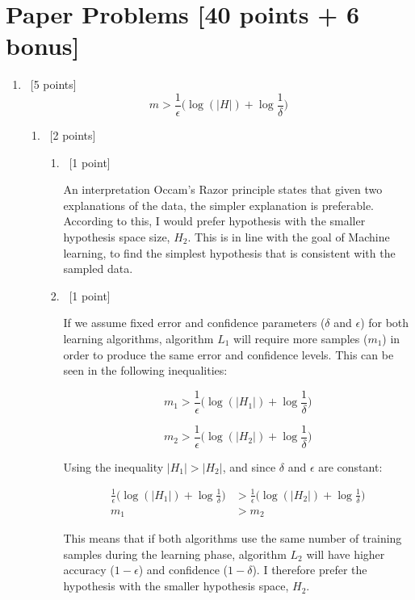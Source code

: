\documentclass[12pt, fullpage,letterpaper]{article}
\begin{document}
\section{Paper Problems [40 points + 6 bonus]}
\begin{enumerate}
\item~[5 points] 
\[
m > \frac{1}{\epsilon}\big(\log(|H|) + \log\frac{1}{\delta}\big)
\]

\begin{enumerate}
	\item~[2 points]
	\begin{enumerate}
		\item~[1 point]
		
		
		An interpretation Occam's Razor principle states that given two explanations of the data, the simpler explanation is preferable. According to this, I would prefer hypothesis with the smaller hypothesis space size, $H_2$. This is in line with the goal of Machine learning, to find the simplest hypothesis that is consistent with the sampled data. 
		
		
		\item~[1 point] 
		
	If we assume fixed error and confidence parameters ($\delta$ and $\epsilon$) for both learning algorithms, algorithm $L_1$ will require more samples ($m_1$) in order to produce the same error and confidence levels. This can be seen in the following inequalities: 	
	
	\[
		m_1 > \frac{1}{\epsilon}\big(\log(|H_1|) + \log\frac{1}{\delta}\big)
	\]
	
	\[
		m_2 > \frac{1}{\epsilon}\big(\log(|H_2|) + \log\frac{1}{\delta}\big)
	\]
	
	Using the inequality $|H_1| > |H_2|$, and since $\delta$ and $\epsilon$ are constant:
	
	\[
		\begin{split}
			 \frac{1}{\epsilon}\big(\log(|H_1|) + \log\frac{1}{\delta}\big) &> \frac{1}{\epsilon}\big(\log(|H_2|) + \log\frac{1}{\delta}\big)
			 \\
			 m_1 &> m_2
		\end{split}
	\]
	
	This means that if both algorithms use the same number of training samples during the learning phase, algorithm $L_2$ will have higher accuracy ($1-\epsilon$) and confidence ($1-\delta$). I therefore prefer the hypothesis with the smaller hypothesis space, $H_2$.
	
	\end{enumerate}
	

\end{enumerate}
\end{enumerate}
\end{document}

